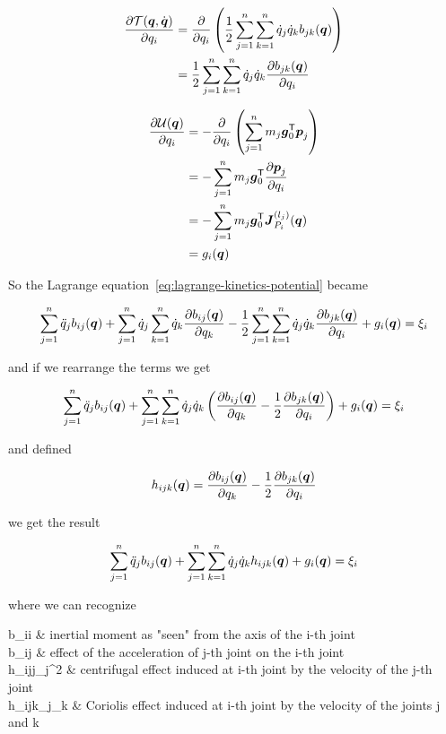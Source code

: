 \begin{align*}
	\frac{\partial \mathcal{T}(\boldsymbol{q},\dot{\boldsymbol{q}})}{\partial q_i}
	&= \frac{\partial}{\partial q_i} \left( \frac{1}{2} \sum_{j=1}^n \sum_{k=1}^n \dot{q}_j \dot{q}_k b_{jk}(\boldsymbol{q}) \right) \\
	&= \frac{1}{2} \sum_{j=1}^n \sum_{k=1}^n \dot{q}_j \dot{q}_k \frac{\partial b_{jk}(\boldsymbol{q})}{\partial q_i}
\end{align*}

\begin{align*}
	\frac{\partial \mathcal{U}(\boldsymbol{q})}{\partial q_i}
	&= - \frac{\partial}{\partial q_i} \left(\sum_{j=1}^n m_j \boldsymbol{g}_0^{\mathsf{T}} \boldsymbol{p}_j \right) \\
	&= - \sum_{j=1}^n m_j \boldsymbol{g}_0^{\mathsf{T}} \frac{\partial \boldsymbol{p}_j}{\partial q_i} \\
	&= - \sum_{j=1}^n m_j \boldsymbol{g}_0^{\mathsf{T}} \boldsymbol{J}_{P_i}^{(l_j)}(\boldsymbol{q}) \\
	&= g_i(\boldsymbol{q})
\end{align*}

So the Lagrange equation~\ref{eq:lagrange-kinetics-potential} became

\[
	\sum_{j=1}^n \ddot{q}_j b_{ij}(\boldsymbol{q}) + \sum_{j=1}^n \dot{q}_j \sum_{k=1}^n \dot{q}_k \frac{\partial b_{ij}(\boldsymbol{q})}{\partial q_k}
	- \frac{1}{2} \sum_{j=1}^n \sum_{k=1}^n \dot{q}_j \dot{q}_k \frac{\partial b_{jk}(\boldsymbol{q})}{\partial q_i} + g_i(\boldsymbol{q}) = \xi_i
\]

and if we rearrange the terms we get

\[
	\sum_{j=1}^n \ddot{q}_j b_{ij}(\boldsymbol{q}) + \sum_{j=1}^n \sum_{k=1}^n \dot{q}_j \dot{q}_k \left( \frac{\partial b_{ij}(\boldsymbol{q})}{\partial q_k} - \frac{1}{2} \frac{\partial b_{jk}(\boldsymbol{q})}{\partial q_i} \right) + g_i(\boldsymbol{q}) = \xi_i
\]

and defined

\[ h_{ijk}(\boldsymbol{q}) = \frac{\partial b_{ij}(\boldsymbol{q})}{\partial q_k} - \frac{1}{2} \frac{\partial b_{jk}(\boldsymbol{q})}{\partial q_i} \]

we get the result

\[
	\sum_{j=1}^n \ddot{q}_j b_{ij}(\boldsymbol{q}) + \sum_{j=1}^n \sum_{k=1}^n \dot{q}_j \dot{q}_k h_{ijk}(\boldsymbol{q}) + g_i(\boldsymbol{q}) = \xi_i
\]

where we can recognize

\begin{conditions}
	b_{ii} & inertial moment as "seen" from the axis of the i-th joint \\
	b_{ij} & effect of the acceleration of j-th joint on the i-th joint \\
	h_{ijj}_j^2 & centrifugal effect induced at i-th joint by the velocity of the j-th joint \\
	h_{ijk}_j_k & Coriolis effect induced at i-th joint by the velocity of the joints j and k
\end{conditions}

